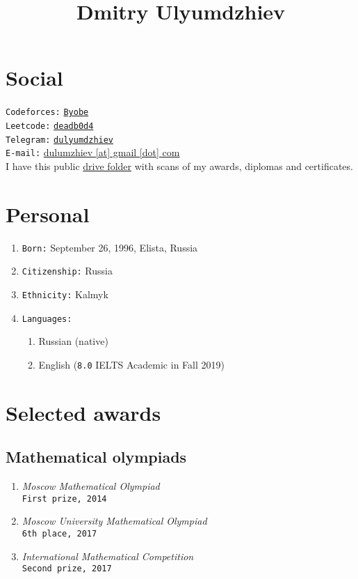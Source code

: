 \documentclass[twocolumn,10pt]{extarticle}
\title{\Huge Dmitry Ulyumdzhiev}
\date{}
\begin{document}
\maketitle

\balance

\thispagestyle{empty}

\section{Social}

\texttt{Codeforces:} \href{https://codeforces.com/profile/Byobe}{\texttt{Byobe}} \\
\texttt{Leetcode:} \href{https://leetcode.com/deadb0d4/}{\texttt{deadb0d4}} \\
\texttt{Telegram:} \href{https://t.me/dulyumdzhiev}{\texttt{dulyumdzhiev}} \\
\texttt{E-mail:} \href{mailto:dulumzhiev@gmail.com}{dulumzhiev [at] gmail [dot] com} \\

{I have this public \href{https://drive.google.com/drive/folders/1NT6w2IOH1FO1XDOfCJ9cktBSh_USbbWq?usp=sharing}{drive folder} with scans of my awards, diplomas and certificates.}

\section{Personal}

\begin{enumerate}
  \item \texttt{Born:} September 26, 1996, Elista, Russia
  \item \texttt{Citizenship:} Russia
  \item \texttt{Ethnicity:} Kalmyk
  \item \texttt{Languages:}
    \begin{enumerate}
      \item Russian (native)
      \item English (\texttt{8.0} IELTS Academic in Fall 2019)
    \end{enumerate}
\end{enumerate}

\section{Selected awards}

\subsection{Mathematical olympiads}
\begin{enumerate}
  \item \textit{Moscow Mathematical Olympiad} \\
    \quad \texttt{First prize, 2014}
  \item \textit{Moscow University Mathematical Olympiad} \\
    \quad \texttt{6th place, 2017}
  \item \textit{International Mathematical Competition} \\
    \quad \texttt{Second prize, 2017}
\end{enumerate}
\end{document}
